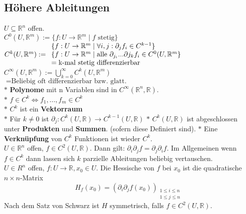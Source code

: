 \subsection{Höhere Ableitungen}
    \(U\subseteq\mathbb R^n\) offen.\\
    \(C^0(U,\mathbb R^m):=\{f:U\rightarrow\mathbb R^m\mid f \text{ stetig}\}\)\\
    \(C^k(U,\mathbb R^m):=\\
    \begin{array}{ll}\{f:U\rightarrow\mathbb R^m\mid \forall i,j:\partial_jf_i\in C^{k-1}\}\\
    \{f:U\rightarrow\mathbb R^m\mid\text{alle }\partial_{j_i}...\partial{j_k}f_i\in C^0(U,\mathbb R^m\}\\=\text{k-mal stetig differenzierbar}\end{array}\)
    \(C^\infty(U,\mathbb R^m):=\bigcup\limits_{k=0}^\infty C^k(U,\mathbb
    R^m)\)\\
    \(=\text{Beliebig oft differenzierbar bzw. glatt.}\)\\ 
    \(*\) \textbf{Polynome} mit n Variablen sind in \(C^\infty(\mathbb R^n,\mathbb R)\).\\
    \(*\) \(f\in C^k\iff f_1,...,f_m\in C^k\)\\
    \(*\) \(C^k\) ist ein \textbf{Vektorraum}\\
    \(*\) Für \(k\neq 0\) ist \(\partial_j: C^k(U,\mathbb R)\rightarrow
    C^{k-1}(U, \mathbb R)\)
    \(*\) \(C^k(U,\mathbb R)\) ist abgeschlossen unter \textbf{Produkten} und
    \textbf{Summen}.
    (sofern diese Definiert sind).
    \(*\) Eine \textbf{Verknüpfung} von \(C^k\) Funktionen ist wieder \(C^k\).\\
    \(U\in\mathbb R^n\) offen, \(f\in C^2(U,\mathbb R)\). Dann gilt:
    \(\partial_i\partial_jf=\partial_j\partial_if\).
    Im Allgemeinen wenn \(f\in C^k\) dann lassen sich \(k\) parzielle
    Ableitungen beliebig vertauschen.\\
    \(U\in R^n\) offen, \(f:U\rightarrow \mathbb R, x_0\in U\).
    Die Hessische von \(f\) bei \(x_0\) ist die quadratische \(n\times
    n\)-Matrix
    \[H_f(x_0)=(\partial_i\partial_j f(x_0))_{\substack{1\leq i\leq n\\ 1\leq
    j\leq n}}\]
    Nach dem Satz von Schwarz ist \(H\) symmetrisch, falls \(f\in C^2(U,\mathbb
    R)\).\\

    
    



